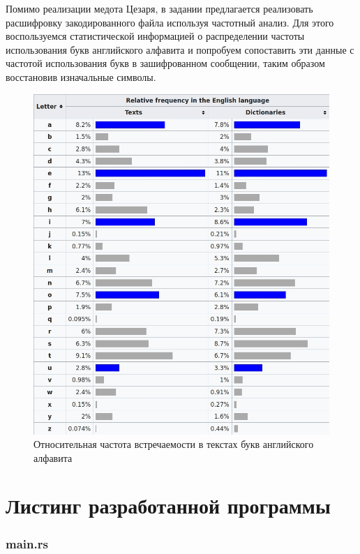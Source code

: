 \documentclass[12pt, a4paper]{article}
\begin{document}
Помимо реализации медота Цезаря, в задании предлагается реализовать
расшифровку закодированного файла используя частотный анализ. Для этого
воспользуемся статистической информацией о распределении частоты
использования букв английского алфавита и попробуем сопоставить эти
данные с частотой использования букв в зашифрованном сообщении,
таким образом восстановив изначальные символы.

\begin{figure}[H]
  \centering
  \includegraphics[scale = 0.5]{freq}
  \caption{Относительная частота встречаемости в текстах букв английского алфавита}
\end{figure}

\newpage
\section*{Листинг разработанной программы}

\subsubsection*{main.rs}


\end{document}
